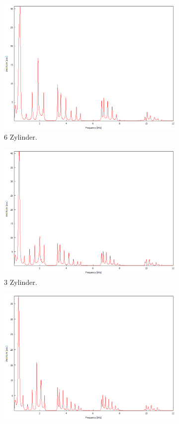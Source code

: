\begin{figure}
\begin{subfigure}[b]{0.3\textwidth}
        \includegraphics[width=\textwidth]{data/4_1/6.png}
        \caption{6 Zylinder.}
    \end{subfigure}
    \hfill
    \begin{subfigure}[b]{0.3\textwidth}
        \centering
        \includegraphics[width=\textwidth]{data/4_1/7.png}
        \caption{3 Zylinder.}
    \end{subfigure}
    \hfill
    \begin{subfigure}[b]{0.3\textwidth}
        \centering
        \includegraphics[width=\textwidth]{data/4_1/8.png}

\end{subfigure}
\end{figure}
